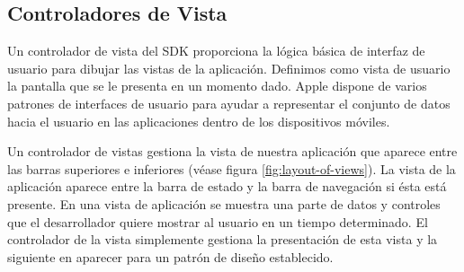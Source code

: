    
\subsection{Controladores de Vista}	   

 
 Un controlador de vista del SDK proporciona la lógica básica de interfaz de usuario para dibujar las vistas de la aplicación. Definimos como vista de usuario la pantalla que se le presenta en un momento dado. Apple dispone de varios patrones de interfaces de usuario para ayudar a representar el conjunto de datos hacia el usuario en las aplicaciones dentro de los dispositivos móviles. 
 
  Un controlador de vistas gestiona la vista de nuestra aplicación que aparece entre las barras superiores e inferiores (véase figura \ref{fig:layout-of-views}).%
  La vista de la aplicación aparece entre la barra de estado y la barra de navegación si ésta está presente. En una vista de aplicación se muestra una parte de datos y controles que el desarrollador quiere mostrar al usuario en un tiempo determinado. El controlador de la vista simplemente gestiona la presentación de esta vista y la siguiente en aparecer para un patrón de diseño establecido.
 
